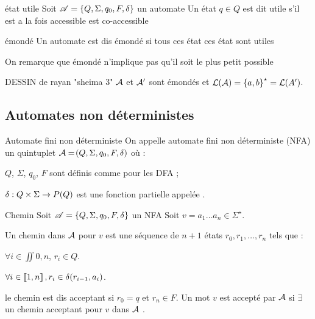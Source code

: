     
    \begin{definition}{état utile}
        Soit $\mathscr{A} = \left\{Q, \Sigma, q_0, F, \delta\right\}$ un automate
        Un état $q \in Q$ est dit utile s'il est a la fois accessible est co-accessible 
        
    \end{definition}
    \begin{definition}{émondé}{}
        Un automate est dis émondé si tous ces état ces état sont utiles 
    \end{definition}
    On remarque que émondé n'implique pas qu'il soit le plus petit possible  
    
    \begin{example}{}{}
        DESSIN de rayan "sheima 3"  
        $\mathcal{A}$ et $\mathcal{A}'$ sont émondés et $\mathcal{L}\!\left(\mathcal{A}\right) = \left\{a, b\right\}^\star = \mathcal{L}\!\left(A'\right)$.
    \end{example}
    
    \subsection{Automates non déterministes}
    
    \begin{definition}{Automate fini non déterministe}
        On appelle automate fini non déterministe (NFA) un quintuplet $\mathcal{A} = \!\left(Q, \Sigma, q_0, F, \delta\right)$ où :
        \begin{enumerate}
            \itast $Q$, $\Sigma$, $q_0$, $F$ sont définis comme pour les DFA ;
            
            \itast $\delta : Q \times \Sigma \to P\!\left(Q\right)$ est une fonction partielle appelée .
        \end{enumerate}
    \end{definition}

    \begin{definition}{Chemin}{}
        Soit $\mathscr{A} = \left\{Q, \Sigma, q_0, F, \delta\right\}$ un NFA 
        Soit $v = a_1 \dots a_n \in \Sigma^\star$.
        
        Un chemin dans $\mathcal{A}$ pour $v$ est une séquence de $n+1$ états $r_0, r_1, \dots, r_n$ tels que :
        
        \begin{enumerate}
            \itast $\forall i \in \iint{0, n}$, $r_i \in Q$.
            
            \itast $\forall i \in \left\llbracket1, n\right\rrbracket, r_i \in \delta\!\left(r_{i-1}, a_i\right)$.
        \end{enumerate}
    
    le chemin est dis acceptant si $r_0=q$ et $r_n \in F$.
    Un mot $v$  est accepté par $\mathcal{A}$ si $\exists$ un chemin acceptant pour $v$ dans $\mathcal{A}$ . 
    
    
    
    
    
    
    \end{definition}
    
